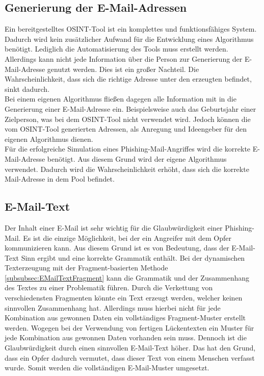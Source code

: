 	\subsection{Generierung der E-Mail-Adressen}
	Ein bereitgestelltes OSINT-Tool ist ein komplettes und funktionsfähiges System. Dadurch wird kein zusätzlicher Aufwand für die Entwicklung eines Algorithmus benötigt. Lediglich die Automatisierung des Tools muss erstellt werden. Allerdings kann nicht jede Information über die Person zur Generierung der E-Mail-Adresse genutzt werden. Dies ist ein großer Nachteil. Die Wahrscheinlichkeit, dass sich die richtige Adresse unter den erzeugten befindet, sinkt dadurch.\\
	Bei einem eigenen Algorithmus fließen dagegen alle Information mit in die Generierung einer E-Mail-Adresse ein. Beispielsweise auch das Geburtsjahr einer Zielperson, was bei dem OSINT-Tool \cite{EmailAssumptions} nicht verwendet wird. Jedoch können die vom OSINT-Tool generierten Adressen, als Anregung und Ideengeber für den eigenen Algorithmus dienen.\\
	Für die erfolgreiche Simulation eines Phishing-Mail-Angriffes wird die korrekte E-Mail-Adresse benötigt. Aus diesem Grund wird der eigene Algorithmus verwendet. Dadurch wird die Wahrscheinlichkeit erhöht, dass sich die korrekte Mail-Adresse in dem Pool befindet.
	
	\subsection{E-Mail-Text}
	Der Inhalt einer E-Mail ist sehr wichtig für die Glaubwürdigkeit einer Phishing-Mail. Es ist die einzige Möglichkeit, bei der ein Angreifer mit dem Opfer kommunizieren kann. Aus diesem Grund ist es von Bedeutung, dass der E-Mail-Text Sinn ergibt und eine korrekte Grammatik enthält. Bei der dynamischen Texterzeugung mit der Fragment-basierten Methode \ref{subsubsec:EMailTextFragment} kann die Grammatik und der Zusammenhang des Textes zu einer Problematik führen. Durch die Verkettung von verschiedensten Fragmenten könnte ein Text erzeugt werden, welcher keinen sinnvollen Zusammenhang hat. Allerdings muss hierbei nicht für jede Kombination aus gewonnen Daten ein vollständiges Fragment-Muster erstellt werden. Wogegen bei der Verwendung von fertigen Lückentexten ein Muster für jede Kombination aus gewonnen Daten vorhanden sein muss. Dennoch ist die Glaubwürdigkeit durch einen sinnvollen E-Mail-Text höher. Das hat den Grund, dass ein Opfer dadurch vermutet, dass dieser Text von einem Menschen verfasst wurde. Somit werden die vollständigen E-Mail-Muster umgesetzt.


	
